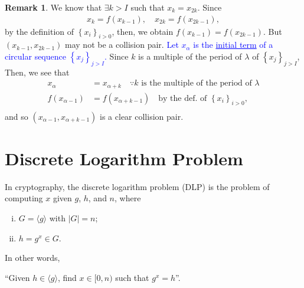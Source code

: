 \documentclass[12pt,openany]{book}
\theoremstyle{definition}
\newtheorem{remark}{Remark}[chapter]
\newcommand{\set}[1]{\left\{#1\right\}}
\newcommand{\abs}[1]{\left\lvert #1 \right\rvert}
\begin{document}
	\begin{remark}
		We know that $\exists k>I$ such that $x_k=x_{2k}$. Since \begin{align*}
		x_k=f(x_{k-1}),\quad x_{2k}=f(x_{2k-1}),
		\end{align*} by the definition of $\set{x_i}_{i>0}$, then, we obtain $f(x_{k-1})=f(x_{2k-1})$. But $(x_{k-1},x_{2k-1})$ may not be a collision pair. \textcolor{blue}{Let $x_\alpha$ is the \underline{initial term} of a circular sequence $\set{x_j}_{j>I}$.} Since $k$ is a multiple of the period of $\lambda$ of $\set{x_j}_{j>I}$, Then, we see that \begin{align*}
		x_\alpha&=x_{\alpha+k}\quad\because\text{$k$ is the multiple of the period of $\lambda$}\\
		f(x_{\alpha-1})&=f(x_{\alpha+k-1})\quad\text{by the def. of $\set{x_i}_{i>0}$},\\
		\end{align*} and so $(x_{\alpha-1},x_{\alpha+k-1})$ is a clear collision pair.
	\end{remark}
	
	\iffalse
	\begin{lstlisting}[style=sage, caption={Small-Sapce Attack (Sage)},captionpos=t]
	N = 2^13 - 1 #12-bit
	n = floor(sqrt(N))
	print("N = {}\nn = floor(sqrt N) = {}\n".format(N,n))
	
	def f(x):
	return (x^2 + 1) % N
	
	# Step 1: Discover k such that x_k = x_{2k}
	x0 = ZZ.random_element(N, 2*N) #x0 is the start node
	x1, x2 = x0, x0
	k = 0
	while True :
	k = k + 1
	x1, x2 = f(x1), f(f(x2))
	if x1 == x2 :
	print ("k = {}, 2k = {}".format(k, 2*k))
	break
	
	# Step 2: Find the collision pair
	x1 , x2 = x0, x2
	for i in [0..k]:
	if f(x1) == f(x2):
	print("Collision: ({}-th elt = {}, {}-th elt = {}) ".format(i, x1, k+i, x2))
	break
	else :
	x1, x2 = f(x1), f(x2)
	
	L = [(0, x0)]
	for j in [1..2*k]:
	L = L + [(j, f(L[j-1][1]))]
	
	# list_plot(L)
	
	for pair in L:
	print(pair)
	\end{lstlisting}
	\fi	
	
	\newpage
	\chapter{Discrete Logarithm Problem}
	In cryptography, the discrete logarithm problem (DLP) is the problem of computing $x$ given $g$, $h$, and $n$, where \begin{enumerate}[(i)]
		\item $G=\langle g\rangle$ with $\abs{G}=n$;
		\item $h=g^x\in G$.
	\end{enumerate} In other words,  \begin{center}
		``Given $h\in\langle g\rangle$, find $x\in[0,n)$ such that $g^x=h$''.
	\end{center}
	
\end{document}
